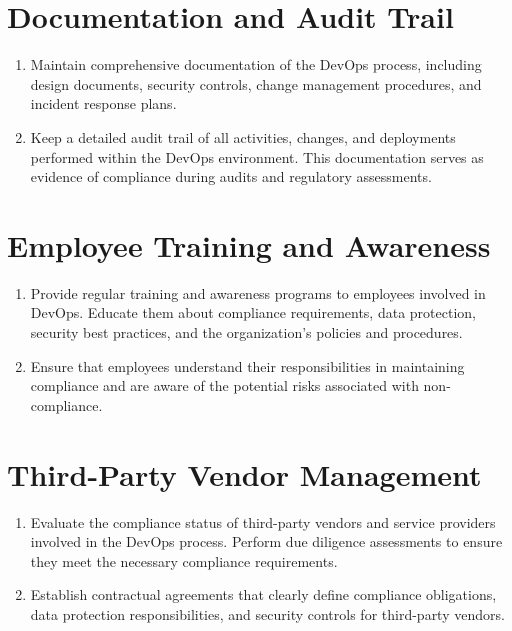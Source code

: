 \section*{Documentation and Audit Trail}
\begin{enumerate}
    \item Maintain comprehensive documentation of the DevOps process, including design documents, security controls, change management procedures, and incident response plans.

    \item Keep a detailed audit trail of all activities, changes, and deployments performed within the DevOps environment. This documentation serves as evidence of compliance during audits and regulatory assessments.
\end{enumerate}

\section*{Employee Training and Awareness}
\begin{enumerate}
    \item Provide regular training and awareness programs to employees involved in DevOps. Educate them about compliance requirements, data protection, security best practices, and the organization's policies and procedures.

    \item Ensure that employees understand their responsibilities in maintaining compliance and are aware of the potential risks associated with non-compliance.
\end{enumerate}

\section*{Third-Party Vendor Management}
\begin{enumerate}
    \item Evaluate the compliance status of third-party vendors and service providers involved in the DevOps process. Perform due diligence assessments to ensure they meet the necessary compliance requirements.

    \item Establish contractual agreements that clearly define compliance obligations, data protection responsibilities, and security controls for third-party vendors.
\end{enumerate}


